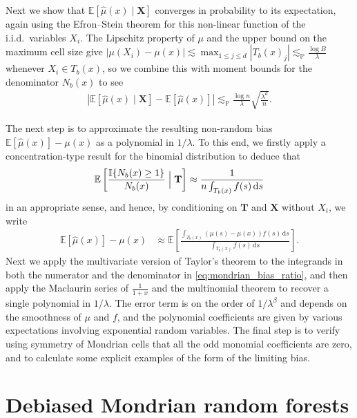 \documentclass[11pt,lof]{puthesis}
\renewcommand{\P}{\ensuremath{\mathbb{P}}}
\newcommand{\E}{\ensuremath{\mathbb{E}}}
\newcommand{\I}{\ensuremath{\mathbb{I}}}
\newcommand{\bX}{\ensuremath{\mathbf{X}}}
\newcommand{\bT}{\ensuremath{\mathbf{T}}}
\newcommand{\diff}[1]{\,\mathrm{d}#1}
\theoremstyle{break}
\theoremstyle{proof}
\begin{document}
Next we show that $\E \left[ \hat \mu(x) \mid \bX \right]$ converges in
probability to its expectation, again using the Efron--Stein theorem for this
non-linear function of the i.i.d.\ variables $X_i$. The Lipschitz property of
$\mu$ and the upper bound on the maximum cell size give
$|\mu(X_i) - \mu(x)| \lesssim \max_{1 \leq j \leq d} |T_b(x)_j|
\lesssim_\P \frac{\log B}{\lambda}$
whenever $X_i \in T_b(x)$,
so we combine this with moment bounds for the denominator $N_b(x)$ to see
%
\begin{align*}
  \left|
  \E \left[ \hat \mu(x) \mid \bX \right]
  - \E \left[ \hat \mu(x) \right]
  \right|
  \lesssim_\P
  \frac{\log n}{\lambda} \sqrt{\frac{\lambda^d}{n}}.
\end{align*}

The next step is to approximate the resulting non-random bias
$\E \left[ \hat \mu(x) \right] - \mu(x)$ as a polynomial in $1/\lambda$.
To this end, we firstly apply a concentration-type result for the binomial
distribution to deduce that
%
\begin{align*}
  \E \left[ \frac{\I\{N_b(x) \geq 1\}}{N_b(x)} \Bigm| \bT \right]
  \approx \frac{1}{n \int_{T_b(x)} f(s) \diff s}
\end{align*}
%
in an appropriate sense, and hence,
by conditioning on $\bT$ and $\bX$ without $X_i$, we write
%
\begin{align}
  \label{eq:mondrian_bias_ratio}
  \E \left[ \hat \mu(x) \right] - \mu(x)
  &\approx
  \E \left[
    \frac{\int_{T_b(x)} (\mu(s) - \mu(x)) f(s) \diff s}
    {\int_{T_b(x)} f(s) \diff s}
  \right].
\end{align}
%
Next we apply the multivariate version of Taylor's theorem to the integrands in
both the numerator and the denominator in \eqref{eq:mondrian_bias_ratio}, and
then apply
the Maclaurin series of $\frac{1}{1+x}$ and the multinomial theorem to recover
a single polynomial in $1/\lambda$. The error term is on the order of
$1/\lambda^\beta$ and depends on the smoothness of $\mu$ and $f$, and the
polynomial coefficients are given by various expectations involving exponential
random variables. The final step is to verify using symmetry of Mondrian cells
that all the odd monomial coefficients are zero, and to calculate some explicit
examples of the form of the limiting bias.

\section{Debiased Mondrian random forests}%
\label{sec:mondrian_debiased}
\end{document}
